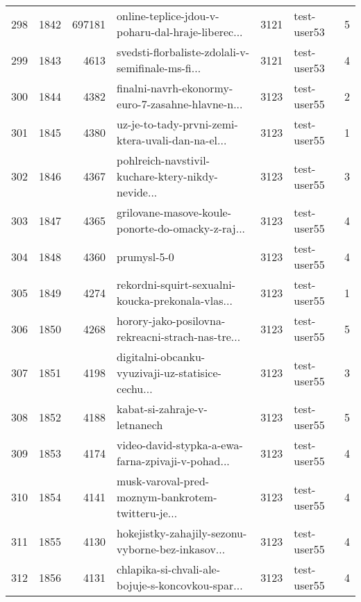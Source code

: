 \begin{tabular}{lrrlrlr}
298  &       1842 &   697181 &  online-teplice-jdou-v-poharu-dal-hraje-liberec... &     3121 &                  test-user53 &               5 \\
299  &       1843 &     4613 &  svedsti-florbaliste-zdolali-v-semifinale-ms-fi... &     3121 &                  test-user53 &               4 \\
300  &       1844 &     4382 &  finalni-navrh-ekonormy-euro-7-zasahne-hlavne-n... &     3123 &                  test-user55 &               2 \\
301  &       1845 &     4380 &  uz-je-to-tady-prvni-zemi-ktera-uvali-dan-na-el... &     3123 &                  test-user55 &               1 \\
302  &       1846 &     4367 &  pohlreich-navstivil-kuchare-ktery-nikdy-nevide... &     3123 &                  test-user55 &               3 \\
303  &       1847 &     4365 &  grilovane-masove-koule-ponorte-do-omacky-z-raj... &     3123 &                  test-user55 &               4 \\
304  &       1848 &     4360 &                                        prumysl-5-0 &     3123 &                  test-user55 &               4 \\
305  &       1849 &     4274 &  rekordni-squirt-sexualni-koucka-prekonala-vlas... &     3123 &                  test-user55 &               1 \\
306  &       1850 &     4268 &  horory-jako-posilovna-rekreacni-strach-nas-tre... &     3123 &                  test-user55 &               5 \\
307  &       1851 &     4198 &  digitalni-obcanku-vyuzivaji-uz-statisice-cechu... &     3123 &                  test-user55 &               3 \\
308  &       1852 &     4188 &                       kabat-si-zahraje-v-letnanech &     3123 &                  test-user55 &               5 \\
309  &       1853 &     4174 &  video-david-stypka-a-ewa-farna-zpivaji-v-pohad... &     3123 &                  test-user55 &               4 \\
310  &       1854 &     4141 &  musk-varoval-pred-moznym-bankrotem-twitteru-je... &     3123 &                  test-user55 &               4 \\
311  &       1855 &     4130 &  hokejistky-zahajily-sezonu-vyborne-bez-inkasov... &     3123 &                  test-user55 &               4 \\
312  &       1856 &     4131 &  chlapika-si-chvali-ale-bojuje-s-koncovkou-spar... &     3123 &                  test-user55 &               4 \\

\end{tabular}
